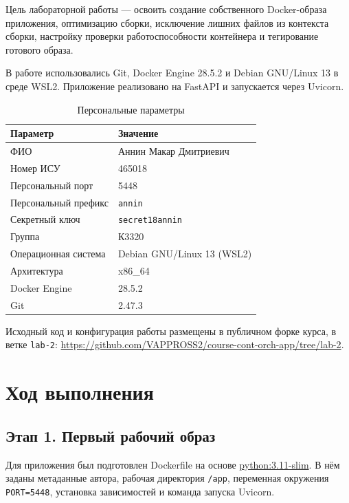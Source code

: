 
Цель лабораторной работы — освоить создание собственного Docker-образа
приложения, оптимизацию сборки, исключение лишних файлов из контекста
сборки, настройку проверки работоспособности контейнера и тегирование
готового образа.

В работе использовались Git, Docker Engine 28.5.2 и Debian GNU/Linux 13
в среде WSL2. Приложение реализовано на FastAPI и запускается через Uvicorn.

\begin{table}[H]
  \caption{Персональные параметры}\label{tab:parameters}
  \centering
  \begin{tabularx}{\textwidth}{|p{}|X|}
    \hline
    Параметр & Значение\\ \hline
    ФИО & Аннин Макар Дмитриевич\\ \hline
    Номер ИСУ & 465018\\ \hline
    Персональный порт & 5448\\ \hline
    Персональный префикс & \texttt{annin}\\ \hline
    Секретный ключ & \texttt{secret18annin}\\ \hline
    Группа & К3320\\ \hline
    Операционная система & Debian GNU/Linux 13 (WSL2)\\ \hline
    Архитектура & x86\_64\\ \hline
    Docker Engine & 28.5.2\\ \hline
    Git & 2.47.3\\ \hline
  \end{tabularx}
\end{table}

Исходный код и конфигурация работы размещены в публичном форке курса,
в ветке \texttt{lab-2}:
\url{https://github.com/VAPPROSS2/course-cont-orch-app/tree/lab-2}.

\chapter{Ход выполнения}

\section{Этап 1. Первый рабочий образ}

Для приложения был подготовлен Dockerfile на основе
\url{python:3.11-slim}. В нём заданы метаданные автора, рабочая
директория \texttt{/app}, переменная окружения \texttt{PORT=5448},
установка зависимостей и команда запуска Uvicorn.

